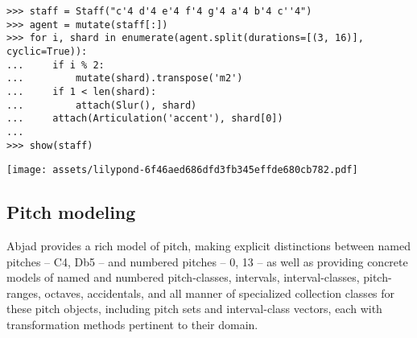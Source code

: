 \begin{comment}
<abjad>
staff = Staff("c'4 d'4 e'4 f'4 g'4 a'4 b'4 c''4")
agent = mutate(staff[:])
for i, shard in enumerate(agent.split(durations=[(3, 16)], cyclic=True)):
    if i %
        mutate(shard).transpose('m2')
    if 1 < len(shard):
        attach(Slur(), shard)
    attach(Articulation('accent'), shard[0])

show(staff)
</abjad>
\end{comment}

\begin{abjadbookoutput}
\begin{singlespacing}
\vspace{-0.5\baselineskip}
\begin{verbatim}
>>> staff = Staff("c'4 d'4 e'4 f'4 g'4 a'4 b'4 c''4")
>>> agent = mutate(staff[:])
>>> for i, shard in enumerate(agent.split(durations=[(3, 16)], cyclic=True)):
...     if i % 2:
...         mutate(shard).transpose('m2')
...     if 1 < len(shard):
...         attach(Slur(), shard)
...     attach(Articulation('accent'), shard[0])
...
>>> show(staff)
\end{verbatim}
\noindent\texttt{[image: assets/lilypond-6f46aed686dfd3fb345effde680cb782.pdf]}
\end{singlespacing}
\end{abjadbookoutput}

\subsection{Pitch modeling}
\label{ssec:pitch-modeling}

Abjad provides a rich model of pitch, making explicit distinctions between
named pitches -- C4, Db5 -- and numbered pitches -- 0, 13 -- as well as
providing concrete models of named and numbered pitch-classes, intervals,
interval-classes, pitch-ranges, octaves, accidentals, and all manner of
specialized collection classes for these pitch objects, including pitch sets
and interval-class vectors, each with transformation methods pertinent to their
domain.

\begin{comment}
<abjad>
pitch_segment = pitchtools.PitchSegment("c' d' e' fs' gf'")
pitch_segment
pitch_segment = pitch_segment.rotate(1, transpose=True)
pitch_segment
pitch_segment[2].accidental
pitch_segment[2].octave
pitch_segment[2].named_pitch_class
pitchtools.IntervalSegment(pitch_segment)
</abjad>
\end{comment}

